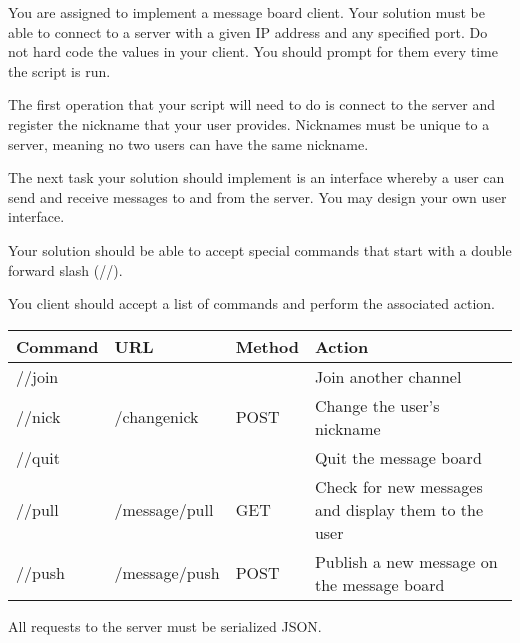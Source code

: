 \begin{problem}
You are assigned to implement a message board client.
Your solution must be able to connect to a server with a given IP address and any specified port.  Do not hard code the values in your client.  You should prompt for them every time the script is run.

The first operation that your script will need to do is connect to the server and register the nickname that your user provides.
Nicknames must be unique to a server, meaning no two users can have the same nickname.

The next task your solution should implement is an interface whereby a user can send and receive messages to and from the server.  You may design your own user interface.

Your solution should be able to accept special commands that start with a double forward slash (//).

You client should accept a list of commands and perform the associated action.
\begin{table}[H]
\begin{tabular}{|l|l|l|p{5cm}|}
\hline
Command & URL & Method & Action \\
\hline
//join & & & Join another channel \\
//nick & /changenick & POST & Change the user's nickname \\
//quit & & & Quit the message board \\
//pull & /message/pull & GET & Check for new messages and display them to the user\\
//push & /message/push & POST & Publish a new message on the message board \\
\hline
\end{tabular}
\end{table}
All requests to the server must be serialized JSON.


\end{problem}
